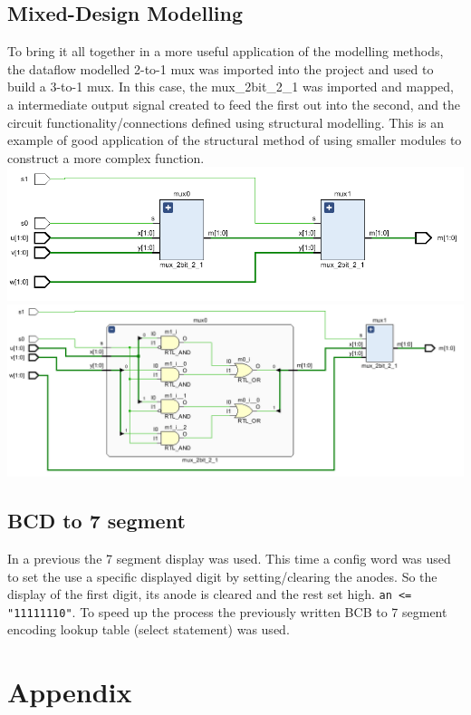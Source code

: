 \documentclass[11pt]{article}
\begin{document}
\begin{preview}
        \subsection{Mixed-Design Modelling}
        To bring it all together in a more useful application of the modelling methods, the dataflow modelled 2-to-1 mux was imported into the project and used to build a 3-to-1 mux. In this case, the mux\_2bit\_2\_1 was imported and mapped, a intermediate output signal created to feed the first out into the second, and the circuit functionality/connections defined using structural modelling. This is an example of good application of the structural method of using smaller modules to construct a more complex function. 
        \includegraphics[width=\textwidth]{res/part4/schem0.PNG}
        \includegraphics[width=\textwidth]{res/part4/schem1.PNG}
        \subsection{BCD to 7 segment}
        In a previous the 7 segment display was used. This time a config word was used to set the use a specific displayed digit by setting/clearing the anodes. So the display of the first digit, its anode is cleared and the rest set high. \texttt{an <= "11111110"}.
        To speed up the process the previously written BCB to 7 segment encoding lookup table (select statement) was used.

\section*{Appendix}


\end{preview}
\end{document}
